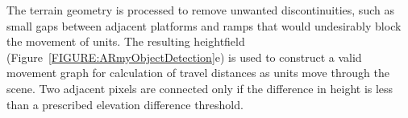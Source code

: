 \documentclass[10pt,twocolumn,letterpaper]{article}
\begin{document}
The terrain geometry is processed to remove unwanted
discontinuities, such as small gaps between adjacent platforms and
ramps that would undesirably block the movement of units.
%
The resulting heightfield (Figure~\ref{FIGURE:ARmyObjectDetection}e) is used to construct a valid movement
graph
for calculation of travel distances
as units move through the scene.  
Two adjacent pixels are connected only if the difference in height is
less than a prescribed elevation difference threshold.  


\end{document}
